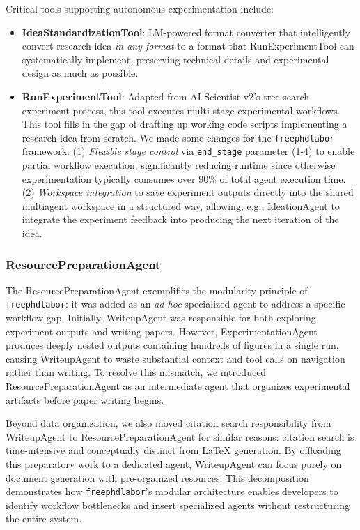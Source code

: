 \documentclass{article}
\begin{document}
Critical tools supporting autonomous experimentation include:
\begin{itemize}
\item \textbf{IdeaStandardizationTool}: LM-powered format converter that intelligently convert research idea \textit{in any format} to a format that RunExperimentTool can systematically implement, preserving technical details and experimental design as much as possible.
\item \textbf{RunExperimentTool}: Adapted from AI-Scientist-v2's \cite{yamadaAIScientistv2WorkshopLevel2025} tree search experiment process, this tool executes multi-stage experimental workflows. This tool fills in the gap of drafting up working code scripts implementing a research idea from scratch. We made some changes for the \texttt{freephdlabor} framework: (1) \textit{Flexible stage control} via \texttt{end\_stage} parameter (1-4) to enable partial workflow execution, significantly reducing runtime since otherwise experimentation typically consumes over 90\% of total agent execution time. (2) \textit{Workspace integration} to save experiment outputs directly into the shared multiagent workspace in a structured way, allowing, e.g., IdeationAgent to integrate the experiment feedback into producing the next iteration of the idea.
\end{itemize}

\subsubsection*{ResourcePreparationAgent}
The ResourcePreparationAgent exemplifies the modularity principle of \texttt{freephdlabor}: it was added as an \textit{ad hoc} specialized agent to address a specific workflow gap. Initially, WriteupAgent was responsible for both exploring experiment outputs and writing papers. However, ExperimentationAgent produces deeply nested outputs containing hundreds of figures in a single run, causing WriteupAgent to waste substantial context and tool calls on navigation rather than writing. To resolve this mismatch, we introduced ResourcePreparationAgent as an intermediate agent that organizes experimental artifacts before paper writing begins.

Beyond data organization, we also moved citation search responsibility from WriteupAgent to ResourcePreparationAgent for similar reasons: citation search is time-intensive and conceptually distinct from LaTeX generation. By offloading this preparatory work to a dedicated agent, WriteupAgent can focus purely on document generation with pre-organized resources. This decomposition demonstrates how \texttt{freephdlabor}'s modular architecture enables developers to identify workflow bottlenecks and insert specialized agents without restructuring the entire system.
\end{document}
